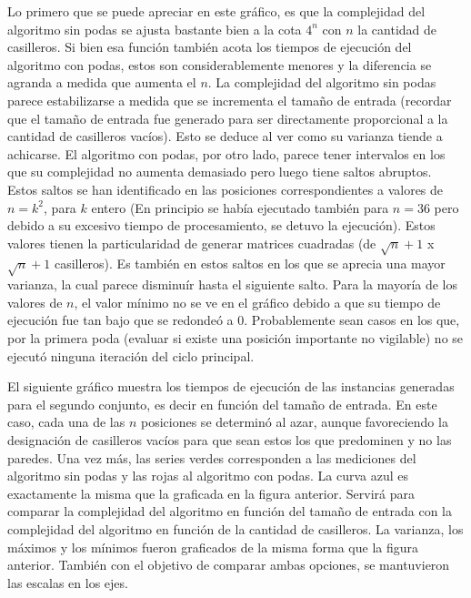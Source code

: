 \par{Lo primero que se puede apreciar en este gr\'afico, es que la complejidad del algoritmo sin podas se ajusta bastante bien a la cota $4^n$ con $n$ la cantidad de casilleros. Si bien esa funci\'on tambi\'en acota los tiempos de ejecuci\'on del algoritmo con podas, estos son considerablemente menores y la diferencia se agranda a medida que aumenta el $n$. La complejidad del algoritmo sin podas parece estabilizarse a medida que se incrementa el tama\~no de entrada (recordar que el tama\~no de entrada fue generado para ser directamente proporcional a la cantidad de casilleros vac\'ios). Esto se deduce al ver como su varianza tiende a achicarse. El algoritmo con podas, por otro lado, parece tener intervalos en los que su complejidad no aumenta demasiado pero luego tiene saltos abruptos. Estos saltos se han identificado en las posiciones correspondientes a valores de $n = k^2$, para $k$ entero (En principio se hab\'ia ejecutado tambi\'en para $n = 36$ pero debido a su excesivo tiempo de procesamiento, se detuvo la ejecuci\'on). Estos valores tienen la particularidad de generar matrices cuadradas (de $\sqrt{n}+1$ x $\sqrt{n}+1$ casilleros). Es tambi\'en en estos saltos en los que se aprecia una mayor varianza, la cual parece disminu\'ir hasta el siguiente salto. Para la mayor\'ia de los valores de $n$, el valor m\'inimo no se ve en el gr\'afico debido a que su tiempo de ejecuci\'on fue tan bajo que se redonde\'o a $0$. Probablemente sean casos en los que, por la primera poda (evaluar si existe una posici\'on importante no vigilable) no se ejecut\'o ninguna iteraci\'on del ciclo principal.}
\par{El siguiente gr\'afico muestra los tiempos de ejecuci\'on de las instancias generadas para el segundo conjunto, es decir en funci\'on del tama\~no de entrada. En este caso, cada una de las $n$ posiciones se determin\'o al azar, aunque favoreciendo la designaci\'on de casilleros vac\'ios para que sean estos los que predominen y no las paredes. Una vez m\'as, las series verdes corresponden a las mediciones del algoritmo sin podas y las rojas al algoritmo con podas. La curva azul es exactamente la misma que la graficada en la figura anterior. Servir\'a para comparar la complejidad del algoritmo en funci\'on del tama\~no de entrada con la complejidad del algoritmo en funci\'on de la cantidad de casilleros. La varianza, los m\'aximos y los m\'inimos fueron graficados de la misma forma que la figura anterior. Tambi\'en con el objetivo de comparar ambas opciones, se mantuvieron las escalas en los ejes.}
